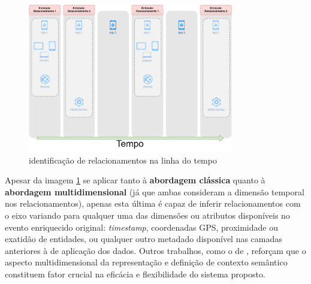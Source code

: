 \newpage

\begin{figure}[h]
\caption{identificação de relacionamentos na linha do tempo}
\label{i:DataChannels}
\centering
\includegraphics[width=0.8\textwidth,height=0.8\textheight,keepaspectratio]{images/DataChannels.png}
\end{figure}

Apesar da imagem \ref{i:DataChannels} se aplicar tanto à \textbf{abordagem clássica} quanto à \textbf{abordagem multidimensional} (já que ambas consideram a dimensão temporal nos relacionamentos), apenas esta última é capaz de inferir relacionamentos com o eixo variando para qualquer uma das dimensões ou atributos disponíveis no evento enriquecido original: \textit{timestamp}, coordenadas GPS, proximidade ou exatidão de entidades, ou qualquer outro metadado disponível nas camadas anteriores à de aplicação dos dados. Outros trabalhos, como o de , reforçam que o aspecto multidimensional da representação e definição de contexto semântico constituem fator crucial na eficácia e flexibilidade do sistema proposto.